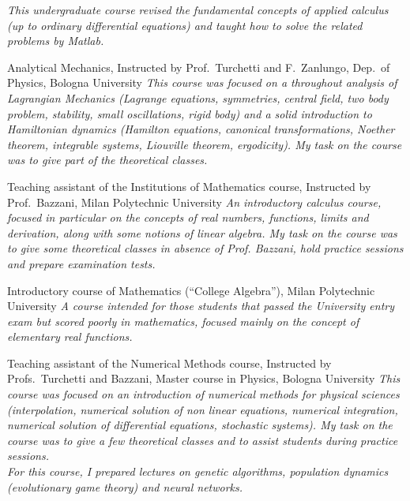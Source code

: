 \documentclass[helvetica,narrow,openbib,notitle,noflag, nologo]{europecv}
\begin{document}
\begin{europecv}
\ecvitem{} {\it This undergraduate course revised the fundamental concepts of applied calculus (up to ordinary differential equations) and 
taught how to solve the related problems by  Matlab.\\}

 {Analytical Mechanics, Instructed by Prof.~Turchetti and F.~Zanlungo, Dep.~of Physics, Bologna University}
\ecvitem{} {\it This course was focused on a throughout analysis of Lagrangian Mechanics (Lagrange equations, symmetries,
central field, two body problem, stability, small oscillations, rigid body) and a solid introduction to Hamiltonian dynamics (Hamilton equations, canonical  transformations, Noether theorem,
integrable systems, Liouville theorem, ergodicity). My task on the course was to give part of the theoretical classes.\\}

 {Teaching assistant of the Institutions of Mathematics course, Instructed by Prof.~Bazzani, Milan Polytechnic University}
\ecvitem{} {\it An introductory calculus course, focused in particular on the concepts of real numbers, functions, limits and derivation,
along with some notions of linear algebra. My task on the course was to give some theoretical classes in absence of Prof. Bazzani, hold practice sessions and prepare examination tests.\\}

 {Introductory course of Mathematics (``College Algebra''), Milan Polytechnic University}
\ecvitem{} {\it A course intended for those students that passed the University entry exam but scored poorly in
mathematics, focused mainly on the concept of elementary real functions.\\}

 {Teaching assistant of the Numerical Methods course, Instructed by Profs.~Turchetti and Bazzani, Master course in Physics, Bologna University}
\ecvitem{} {\it This course was focused on an introduction of 
numerical methods for physical sciences (interpolation, numerical solution of non linear
equations,
numerical integration, numerical solution of differential equations, stochastic systems). My task on the course was to give a few theoretical classes
and to assist students during practice sessions.\\}
\ecvitem{} {\it For this course, I prepared lectures on genetic algorithms, population dynamics (evolutionary game theory) and neural networks.\\}


\end{europecv}
\end{document}
